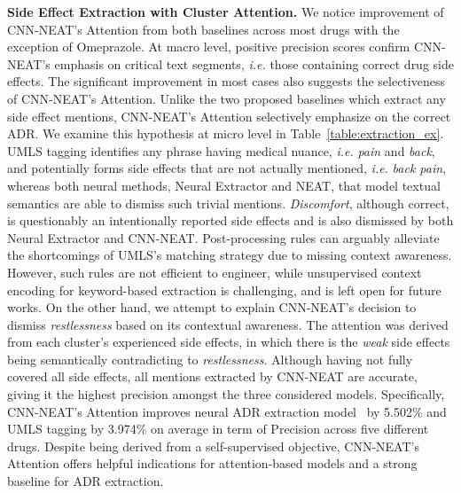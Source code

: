 \documentclass{bmcart}
\begin{document}
{\bf Side Effect Extraction with Cluster Attention.} We notice improvement of CNN-NEAT's Attention from both baselines across most drugs with the exception of Omeprazole. At macro level, positive precision scores confirm CNN-NEAT's emphasis on critical text segments, \textit{i.e.} those containing correct drug side effects. The significant improvement in most cases also suggests the selectiveness of CNN-NEAT's Attention. Unlike the two proposed baselines which extract any side effect mentions, CNN-NEAT's Attention selectively emphasize on the correct ADR. We examine this hypothesis at micro level in Table~\ref{table:extraction_ex}. UMLS tagging identifies any phrase having medical nuance, \textit{i.e.} \textit{pain} and \textit{back}, and potentially forms side effects that are not actually mentioned, \textit{i.e.} \textit{back pain}, whereas both neural methods, Neural Extractor and NEAT, that model textual semantics are able to dismiss such trivial mentions. \textit{Discomfort}, although correct, is questionably an intentionally reported side effects and is also dismissed by both Neural Extractor and CNN-NEAT. Post-processing rules can arguably alleviate the shortcomings of UMLS's matching strategy due to missing context awareness. However, such rules are not efficient to engineer, while unsupervised context encoding for keyword-based extraction is challenging, and is left open for future works. On the other hand, we attempt to explain CNN-NEAT's decision to dismiss \textit{restlessness} based on its contextual awareness. The attention was derived from each cluster's experienced side effects, in which there is the \textit{weak} side effects being semantically contradicting to \textit{restlessness}. Although having not fully covered all side effects, all mentions extracted by CNN-NEAT are accurate, giving it the highest precision amongst the three considered models. Specifically, CNN-NEAT's Attention improves neural ADR extraction model~\cite{ding2018attentive} by 5.502\% and UMLS tagging by 3.974\% on average in term of Precision across five different drugs. Despite being derived from a self-supervised objective, CNN-NEAT's Attention offers helpful indications for attention-based models and a strong baseline for ADR extraction. \\
\end{document}
